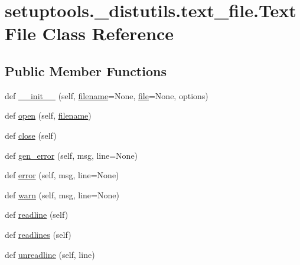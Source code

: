 \hypertarget{classsetuptools_1_1__distutils_1_1text__file_1_1TextFile}{}\section{setuptools.\+\_\+distutils.\+text\+\_\+file.\+Text\+File Class Reference}
\label{classsetuptools_1_1__distutils_1_1text__file_1_1TextFile}
\subsection*{Public Member Functions}
\begin{DoxyCompactItemize}
\item 
def \hyperlink{classsetuptools_1_1__distutils_1_1text__file_1_1TextFile_abd29417bf635e1fff86e41503372f26c}{\+\_\+\+\_\+init\+\_\+\+\_\+} (self, \hyperlink{classsetuptools_1_1__distutils_1_1text__file_1_1TextFile_afa3c8c807f2d41d1b545d0c5234d57b1}{filename}=None, \hyperlink{classsetuptools_1_1__distutils_1_1text__file_1_1TextFile_abd3c184f659c9267591b68eed9e6263a}{file}=None, options)
\item 
def \hyperlink{classsetuptools_1_1__distutils_1_1text__file_1_1TextFile_ae603687e438433de3b47c9fc729c2f29}{open} (self, \hyperlink{classsetuptools_1_1__distutils_1_1text__file_1_1TextFile_afa3c8c807f2d41d1b545d0c5234d57b1}{filename})
\item 
def \hyperlink{classsetuptools_1_1__distutils_1_1text__file_1_1TextFile_a93fc9674bb2e728766c41de29711e2fa}{close} (self)
\item 
def \hyperlink{classsetuptools_1_1__distutils_1_1text__file_1_1TextFile_a52ca2c96ed7641a207a2573ff953d44d}{gen\+\_\+error} (self, msg, line=None)
\item 
def \hyperlink{classsetuptools_1_1__distutils_1_1text__file_1_1TextFile_a95a459186291d0c601cd02a17e219da8}{error} (self, msg, line=None)
\item 
def \hyperlink{classsetuptools_1_1__distutils_1_1text__file_1_1TextFile_ad1e288f07d9181231045ac5e7e0ae842}{warn} (self, msg, line=None)
\item 
def \hyperlink{classsetuptools_1_1__distutils_1_1text__file_1_1TextFile_a9e3ed6e5ba66191015aa682183d55db5}{readline} (self)
\item 
def \hyperlink{classsetuptools_1_1__distutils_1_1text__file_1_1TextFile_aa066754c670227f4eb2cfd024c7f0763}{readlines} (self)
\item 
def \hyperlink{classsetuptools_1_1__distutils_1_1text__file_1_1TextFile_aab875300ab8aedf894e6bf967aa5e943}{unreadline} (self, line)
\end{DoxyCompactItemize}
